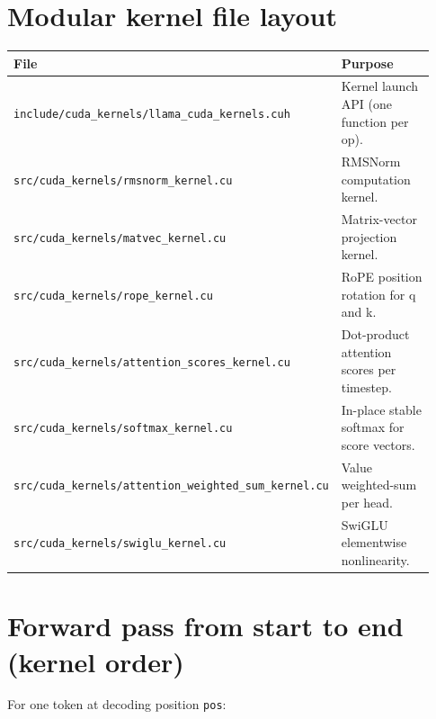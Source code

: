 \documentclass[11pt]{article}
\begin{document}
\section{Modular kernel file layout}
\begin{longtable}{p{0.43\linewidth} p{0.5\linewidth}}
\toprule
\textbf{File} & \textbf{Purpose} \\
\midrule
\endhead
\texttt{include/cuda\_kernels/llama\_cuda\_kernels.cuh} & Kernel launch API (one function per op). \\
\texttt{src/cuda\_kernels/rmsnorm\_kernel.cu} & RMSNorm computation kernel. \\
\texttt{src/cuda\_kernels/matvec\_kernel.cu} & Matrix-vector projection kernel. \\
\texttt{src/cuda\_kernels/rope\_kernel.cu} & RoPE position rotation for q and k. \\
\texttt{src/cuda\_kernels/attention\_scores\_kernel.cu} & Dot-product attention scores per timestep. \\
\texttt{src/cuda\_kernels/softmax\_kernel.cu} & In-place stable softmax for score vectors. \\
\texttt{src/cuda\_kernels/attention\_weighted\_sum\_kernel.cu} & Value weighted-sum per head. \\
\texttt{src/cuda\_kernels/swiglu\_kernel.cu} & SwiGLU elementwise nonlinearity. \\
\bottomrule
\end{longtable}

\section{Forward pass from start to end (kernel order)}
For one token at decoding position \texttt{pos}:
\end{document}
